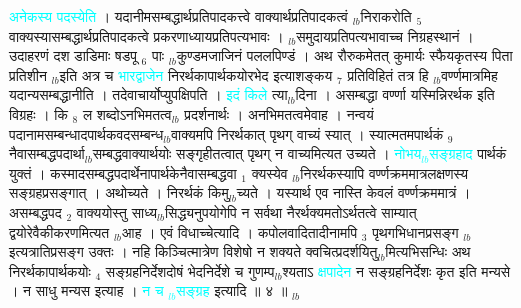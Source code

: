 \documentclass[article,12pt,a4paper]{memoir}%
\newcommand{\quotelemma}[1]{\textcolor{cyan}{#1}}
\newcounter{parCount}
\begin{document}
	  
	  \pstart \leavevmode%
	\hphantom{.}\quotelemma{अनेकस्य पदस्येति} । यदानीमसम्बद्धार्थप्रतिपादकत्त्वे वाक्यार्थप्रतिपादकत्वं {\tiny $_{lb}$}निराकरोति {\tiny $_{5}$} वाक्यस्यासम्बद्धार्थप्रतिपादकत्वे प्रकरणाध्यायप्रतिपत्यभावः । {\tiny $_{lb}$}समुदायप्रतिपत्यभावाच्च निग्रहस्थानं । उदाहरणं दश डाडिमाः षडपू {\tiny $_{6}$} पाः {\tiny $_{lb}$}कुण्डमजाजिनं पललपिण्डं । अथ रौरुकमेतत् कुमार्यः स्फैयकृतस्य पिता प्रतिशीन {\tiny $_{lb}$}इति अत्र च \quotelemma{भारद्वाजेन} निरर्थकापार्थकयोरभेद इत्याशङ्कय {\tiny $_{7}$} प्रतिविहितं तत्र हि {\tiny $_{lb}$}वर्ण्णमात्रमिह यदान्यसम्बद्धानीति । तदेवाचार्योप्युपक्षिपति । \quotelemma{इदं किले} \cite[14a2]{vn-msN} त्या{\tiny $_{lb}$}दिना । असम्बद्धा वर्ण्णा यस्मिन्निरर्थक इति विग्रहः । कि {\tiny $_{8}$} ल शब्दोऽनभिमतत्व{\tiny $_{lb}$}\leavevmode{} प्रदर्शनार्थः । अनभिमतत्वमेवाह । नन्वयं पदानामसम्बन्धादपार्थकवदसम्बन्ध{\tiny $_{lb}$}वाक्यमपि निरर्थकात् पृथग् वाच्यं स्यात् । स्यात्मतमपार्थकं {\tiny $_{9}$} \leavevmode{} नैवासम्बद्धपदार्था{\tiny $_{lb}$}सम्बद्धवाक्यार्थयोः सङ्गृहीतत्वात् पृथग् न वाच्यमित्यत उच्यते । \quotelemma{नोभय{\tiny $_{lb}$}सङ्ग्रहाद} \cite[14a3]{vn-msN} पार्थकं युक्तं । कस्मादसम्बद्धपदार्थेनापार्थकेनैवासम्बद्धवा {\tiny $_{1}$} क्यस्येव {\tiny $_{lb}$}निरर्थकस्यापि वर्ण्णक्रममात्रलक्षणस्य सङ्ग्रहप्रसङ्गात् । अथोच्यते । निरर्थकं किमु{\tiny $_{lb}$}च्यते । यस्यार्थ एव नास्ति केवलं वर्ण्णक्रममात्रं । असम्बद्धपद {\tiny $_{2}$} वाक्ययोस्तु साध्य{\tiny $_{lb}$}सिद्ध्यनुपयोगेपि न सर्वथा नैरर्थक्यमतोऽर्थतत्वे साम्यात् द्वयोरेवैकीकरणमित्यत {\tiny $_{lb}$}आह । एवं विधाच्चेत्यादि । कपोलवादितादीनामपि {\tiny $_{3}$} पृथगभिधानप्रसङ्ग {\tiny $_{lb}$}इत्यत्रातिप्रसङ्ग उक्तः । नहि किञ्चित्मात्रेण विशेषो न शक्यते क्वचित्प्रदर्शयितु{\tiny $_{lb}$}मित्यभिसन्धिः अथ निरर्थकापार्थकयोः {\tiny $_{4}$} सङ्ग्रहनिर्देशदोषं भेदनिर्देशे च गुणम्प{\tiny $_{lb}$}श्यताऽ \quotelemma{क्षपादेन} न सङ्ग्रहनिर्देशः कृत इति मन्यसे । न साधु मन्यस इत्याह । \quotelemma{न च {\tiny $_{lb}$}सङ्ग्रह} \cite[14a4]{vn-msN} इत्यादि ॥ ४ ॥ 
	{}
	\pend%
      {\tiny $_{lb}$}
\end{document}
